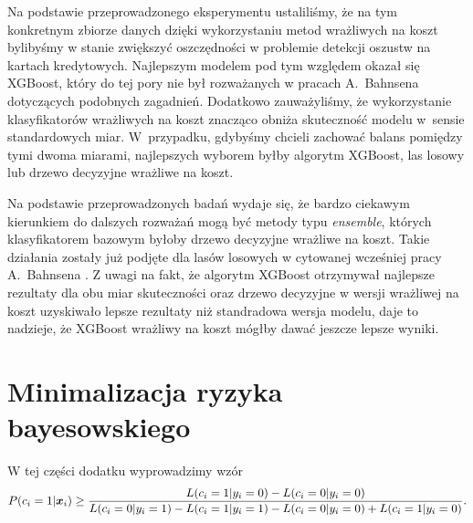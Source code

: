 \documentclass[inzynierska]{pwr_wmat_praca_dyplomowa}
\theoremstyle{plain}
\numberwithin{theorem}{chapter}
\theoremstyle{definition}
\numberwithin{theorem}{chapter}
\begin{document}
Na podstawie przeprowadzonego eksperymentu ustaliliśmy, że na tym konkretnym zbiorze danych dzięki wykorzystaniu metod wrażliwych na koszt bylibyśmy w stanie zwiększyć oszczędności w problemie detekcji oszustw na kartach kredytowych. Najlepszym modelem pod tym względem okazał się XGBoost, który do tej pory nie był rozważanych w pracach A.~Bahnsena dotyczących podobnych zagadnień. Dodatkowo zauważyliśmy, że wykorzystanie klasyfikatorów wrażliwych na koszt znacząco obniża skuteczność modelu w~sensie standardowych miar. W~przypadku, gdybyśmy chcieli zachować balans pomiędzy tymi dwoma miarami, najlepszych wyborem byłby algorytm XGBoost, las losowy lub drzewo decyzyjne wrażliwe na koszt.

Na podstawie przeprowadzonych badań wydaje się, że bardzo ciekawym kierunkiem do dalszych rozważań mogą być metody typu \textit{ensemble}, których klasyfikatorem bazowym byłoby drzewo decyzyjne wrażliwe na koszt. Takie działania zostały już podjęte dla lasów losowych w cytowanej wcześniej pracy A.~Bahnsena \cite{alej2015ensemble}. Z uwagi na fakt, że algorytm XGBoost otrzymywał najlepsze rezultaty dla obu miar skuteczności oraz drzewo decyzyjne w wersji wrażliwej na koszt uzyskiwało lepsze rezultaty niż standradowa wersja modelu, daje to nadzieje, że XGBoost wrażliwy na koszt mógłby dawać jeszcze lepsze wyniki.


\appendix

\chapter{Minimalizacja ryzyka bayesowskiego}
\label{bmr-proof}
W tej części dodatku wyprowadzimy wzór 
$$ P(c_i = 1|\boldsymbol{x}_{i}) \ge \frac{L(c_i = 1|y_i = 0) - L(c_i = 0|y_i = 0)}{L(c_i = 0|y_i = 1) - L(c_i = 1|y_i = 1) - L(c_i = 0|y_i = 0) + L(c_i = 1|y_i = 0)} \text{.}$$
\end{document}
